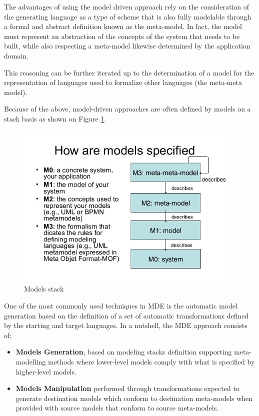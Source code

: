 The advantages of using the model driven approach rely on the consideration of the generating language as a type of scheme that is also fully modelable through a formal and abstract definition known as the meta-model. In fact, the model must represent an abstraction of the concepts of the system that needs to be built, while also respecting a meta-model likewise determined by the application domain.

This reasoning can be further iterated up to the determination of a model for the representation of languages used to formalize other languages (the meta-meta model).

Because of the above, model-driven approaches are often defined by models on a stack basis as shown on Figure \ref{fig:mde}.

\vspace{0cm}
\begin{figure}[htbp]
  \centering
    \includegraphics[height=8cm]{images/mde}
  \caption{Models stack}
  \label{fig:mde}
\end{figure}
\vspace{0cm}

One of the most commonly used techniques in MDE is the automatic model generation based on the definition of a set of automatic transformations defined by the starting and target languages. In a nutshell, the MDE approach consists of:

\begin{itemize}
  \item \textbf{Models Generation}, based on modeling stacks definition supporting meta-modelling methods where lower-level models comply with what is specified by higher-level models.

  \item \textbf{Models Manipulation} performed through transformations expected to generate destination models which conform to destination meta-models when provided with source models that conform to source meta-models.
\end{itemize} 

